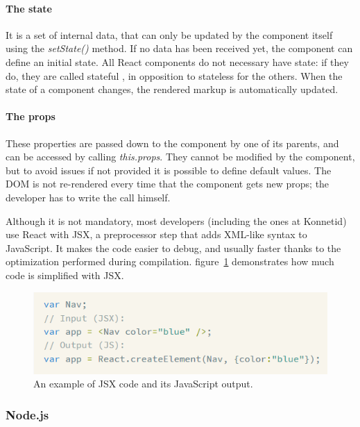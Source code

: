 \paragraph{The state} It is a set of internal data, that can only be updated by the component itself using the \textit{setState()}  method. If no data has been received yet, the component can define an initial state. All React components do not necessary have state: if they do, they are called \guillemotleft{} stateful \guillemotright{}, in opposition to \guillemotleft{} stateless \guillemotright{} for the others. When the state of a component changes, the rendered markup is automatically updated.

\paragraph{The props} These properties are passed down to the component by one of its parents, and can be accessed by calling \textit{this.props}. They cannot be modified by the component, but to avoid issues if not provided it is possible to define default values. The DOM is not re-rendered every time that the component gets new props; the developer has to write the call himself.

Although it is not mandatory, most developers (including the ones at Konnetid) use React with JSX, a preprocessor step that adds XML-like syntax to JavaScript. It makes the code easier to debug, and usually faster thanks to the optimization performed during compilation. {\sc figure}~\ref{fig:jsx} demonstrates how much code is simplified with JSX.

\begin{figure}[H]
    \centering
    \includegraphics[scale=0.9]{figure/jsx.png}
    \caption{An example of JSX code and its JavaScript output.}
    \label{fig:jsx}
\end{figure}

\subsubsection{Node.js}
\label{sssec:node}

